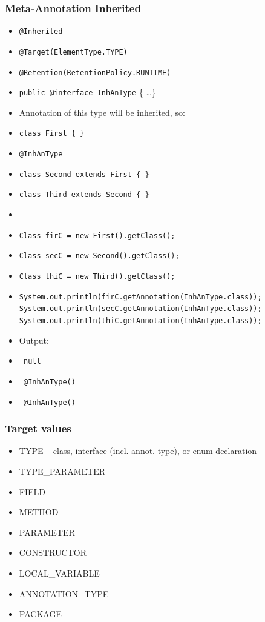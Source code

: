\documentclass[10pt,xcolor=pdflatex]{beamer}
\begin{document}
\begin{frame}[fragile]\frametitle{Meta-Annotation Inherited}
\begin{itemize}
    \small
	\item[] \texttt{@Inherited}
	\item[] \texttt{@Target(ElementType.TYPE)}
    \item[] \texttt{@Retention(RetentionPolicy.RUNTIME)}
    \item[] \texttt{public @interface InhAnType} \{ \ldots \}
	\item Annotation of this type will be inherited, so:
	\item[] \texttt{class First \{ \}}
	\item[] \texttt{@InhAnType}
	\item[] \texttt{class Second extends First \{ \}}
    \item[] \texttt{class Third extends Second \{ \}}
    \item[]
    \item[] \texttt{Class firC = new First().getClass();}
    \item[] \texttt{Class secC = new Second().getClass();}
    \item[] \texttt{Class thiC = new Third().getClass();}
    \item[] \texttt{System.out.println(firC.getAnnotation(InhAnType.class)); System.out.println(secC.getAnnotation(InhAnType.class)); System.out.println(thiC.getAnnotation(InhAnType.class));}
	\item[] Output:
	\item[] \texttt{ null}
	\item[] \texttt{ @InhAnType()}
	\item[] \texttt{ @InhAnType()}
	\normalsize
\end{itemize}
\end{frame}


\begin{frame}\frametitle{Target values}
\begin{itemize}
	\item TYPE {\small -- class, interface (incl. annot. type), or enum declaration}
	\item TYPE\_PARAMETER
	\item FIELD
	\item METHOD
	\item PARAMETER
	\item CONSTRUCTOR
	\item LOCAL\_VARIABLE
	\item ANNOTATION\_TYPE
	\item PACKAGE
\end{itemize}
\end{frame}
\end{document}
